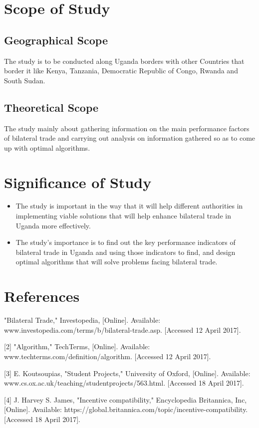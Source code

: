 \documentclass[12pt,a4paper]{article}
\begin{document}
\section{Scope of Study}
\subsection{Geographical Scope}
The study is to be conducted along Uganda borders with other Countries that border it like Kenya, Tanzania, Democratic Republic of Congo, Rwanda and South Sudan.

\subsection{Theoretical Scope}
The study mainly about gathering information on the main performance factors of bilateral trade and carrying out analysis on information gathered so as to come up with optimal algorithms.

\section{Significance of Study}
\begin{itemize}
\item The study is important in the way that it will help different authorities in implementing viable solutions that will help enhance bilateral trade in Uganda more effectively.
\item The study’s importance is to find out the key performance indicators of bilateral trade in Uganda and using those indicators to find, and design optimal algorithms that will solve problems facing bilateral trade.
\end{itemize}
\section{References}
\begin{bibliography}
[[1] 	"Bilateral Trade," Investopedia, [Online]. Available: www.investopedia.com/terms/b/bilateral-trade.asp. [Accessed 12 April 2017].
	
[2] 	"Algorithm," TechTerms, [Online]. Available: www.techterms.com/definition/algorithm. [Accessed 12 April 2017].
	
[3] 	E. Koutsoupias, "Student Projects," University of Oxford, [Online]. Available: www.cs.ox.ac.uk/teaching/studentprojects/563.html. [Accessed 18 April 2017].
	
[4] 	J. Harvey S. James, "Incentive compatibility," Encyclopedia Britannica, Inc, [Online]. Available: https://global.britannica.com/topic/incentive-compatibility. [Accessed 18 April 2017].	
\end{bibliography}
\end{document}
